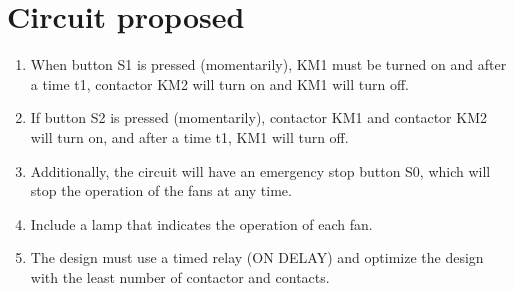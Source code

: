 \documentclass[runningheads]{llncs}
\begin{document}
\newpage

\section{Circuit proposed}
\begin{enumerate}
    \item When button S1 is pressed (momentarily), KM1 must be turned on and after a 
    time t1, contactor KM2 will turn on and KM1 will turn off. 
    \item If button S2 is pressed (momentarily), contactor KM1 and contactor KM2 will turn 
    on, and after a time t1, KM1 will turn off. 
    \item  Additionally, the circuit will have an emergency stop button S0, which will stop 
    the operation of the fans at any time. 
    \item  Include a lamp that indicates the operation of each fan. 
    \item  The design must use a timed relay (ON DELAY) and optimize the design with 
    the least number of contactor and contacts. 
    
\end{enumerate}

\newpage


% 
% 
\end{document}
